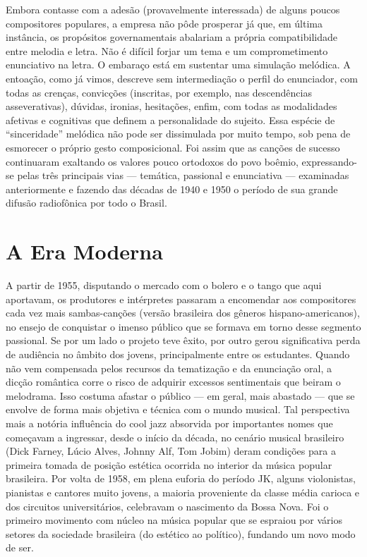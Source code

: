 Embora contasse com a adesão (provavelmente interessada) de alguns
poucos compositores populares, a empresa não pôde prosperar já que, em
última instância, os propósitos governamentais abalariam a própria
compatibilidade entre melodia e letra. Não é difícil forjar um tema e um
comprometimento enunciativo na letra. O embaraço está em sustentar uma
simulação melódica. A entoação, como já vimos, descreve sem
intermediação o perfil do enunciador, com todas as crenças, convicções
(inscritas, por exemplo, nas descendências asseverativas), dúvidas,
ironias, hesitações, enfim, com todas as modalidades afetivas e
cognitivas que definem a personalidade do sujeito. Essa espécie de
``sinceridade'' melódica não pode ser dissimulada por muito tempo, sob
pena de esmorecer o próprio gesto composicional. Foi assim que as
canções de sucesso continuaram exaltando os valores pouco ortodoxos do
povo boêmio, expressando-se pelas três principais vias --- temática,
passional e enunciativa --- examinadas anteriormente e fazendo das
décadas de 1940 e 1950 o período de sua grande difusão radiofônica por
todo o Brasil.

\section{A Era Moderna}

A partir de 1955, disputando o mercado com o bolero e o tango que aqui
aportavam, os produtores e intérpretes passaram a encomendar aos
compositores cada vez mais sambas-canções (versão brasileira dos gêneros
hispano-americanos), no ensejo de conquistar o imenso público que se
formava em torno desse segmento passional. Se por um lado o projeto teve
êxito, por outro gerou significativa perda de audiência no âmbito dos
jovens, principalmente entre os estudantes. Quando não vem compensada
pelos recursos da tematização e da enunciação oral, a dicção romântica
corre o risco de adquirir excessos sentimentais que beiram o melodrama.
Isso costuma afastar o público --- em geral, mais abastado --- que se
envolve de forma mais objetiva e técnica com o mundo musical. Tal
perspectiva mais a notória influência do cool jazz absorvida por
importantes nomes que começavam a ingressar, desde o início da década,
no cenário musical brasileiro (Dick Farney, Lúcio Alves, Johnny Alf, Tom
Jobim) deram condições para a primeira tomada de posição estética
ocorrida no interior da música popular brasileira. Por volta de 1958, em
plena euforia do período JK, alguns violonistas, pianistas e cantores
muito jovens, a maioria proveniente da classe média carioca e dos
circuitos universitários, celebravam o nascimento da Bossa Nova. Foi o
primeiro movimento com núcleo na música popular que se espraiou por
vários setores da sociedade brasileira (do estético ao político),
fundando um novo modo de ser.

